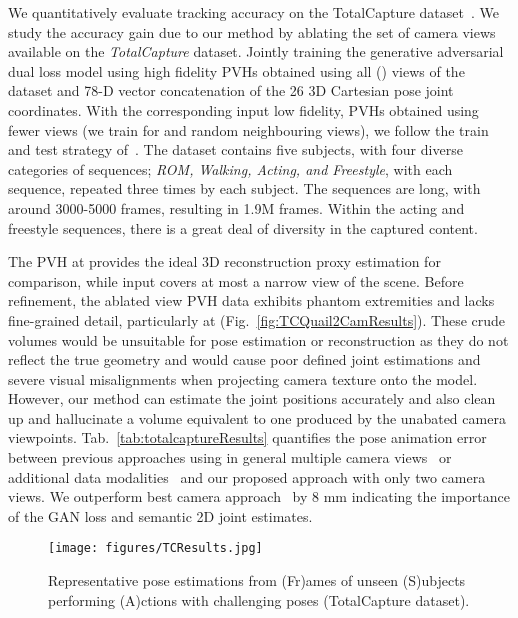 \documentclass{bmvc2k}
\begin{document}
We quantitatively evaluate tracking accuracy on the TotalCapture dataset~\cite{trumble_total_2017}. 
We study the accuracy gain due to our method by ablating the set of camera views available on the {\em TotalCapture} dataset.  Jointly training the generative adversarial dual loss model using high fidelity PVHs obtained using all () views of the dataset and 78-D vector concatenation of the 26 3D Cartesian pose joint coordinates. With the corresponding input low fidelity, PVHs obtained using fewer views (we train for  and  random neighbouring views), we follow the train and test strategy of~\cite{trumble_total_2017}. The dataset contains five subjects, with four diverse categories of sequences; \emph{ROM, Walking, Acting, and Freestyle}, with each sequence, repeated three times by each subject. The sequences are long, with around 3000-5000 frames, resulting in 1.9M frames. Within the acting and freestyle sequences, there is a great deal of diversity in the captured content.


 The PVH at  provides the ideal 3D reconstruction proxy estimation for comparison, while  input covers at most a narrow  view of the scene.  Before refinement, the ablated view PVH data exhibits phantom extremities and lacks fine-grained detail, particularly at  (Fig.~\ref{fig:TCQuail2CamResults}). These crude volumes would be unsuitable for pose estimation or reconstruction as they do not reflect the true geometry and would cause poor defined joint estimations and severe visual misalignments when projecting camera texture onto the model. However, our method can estimate the joint positions accurately and also clean up and hallucinate a volume equivalent to one produced by the unabated  camera viewpoints. Tab.~\ref{tab:totalcaptureResults} quantifies the pose animation error between previous approaches using in general multiple camera views~\cite{cao2016realtimeCPM,TrumbleCVMP2DConvNet,trumble_total_2017,trumble:eccv:2018} or additional data modalities~\cite{trumble_total_2017,PonsECCV18} and our proposed approach with only two camera views. 
We outperform best camera approach~\cite{Qiu:iccv:2019} by 8 mm indicating the importance of the GAN loss and semantic 2D joint estimates.
 
\begin{figure}[htb]
\centering
\texttt{[image: figures/TCResults.jpg]}
\caption{Representative pose estimations from (Fr)ames of unseen (S)ubjects performing (A)ctions with challenging poses (TotalCapture dataset).}
\label{fig:TCResults}
\end{figure}
\end{document}

